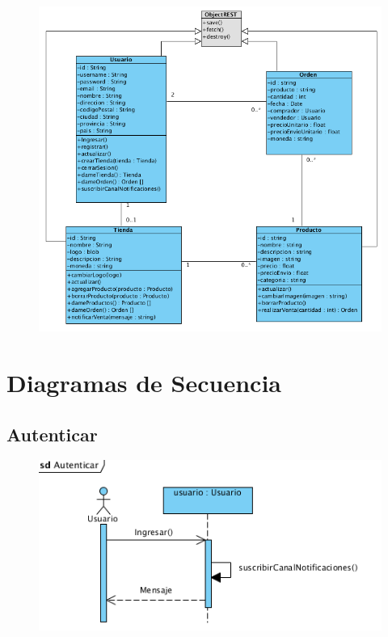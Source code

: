 \begin{figure}[H]
  \centering
    \includegraphics[width=1\textwidth]{imagenes/disenio/clases-disenio.png}
    \label{fig:diagrama-clases-disenio}
\end{figure}

\section{Diagramas de Secuencia}

\subsection{Autenticar}
\begin{figure}[H]
  \centering
    \includegraphics{imagenes/disenio/secuencia-autenticar.png}
    \label{fig:diagrama-secuencia-autenticar}
\end{figure}


